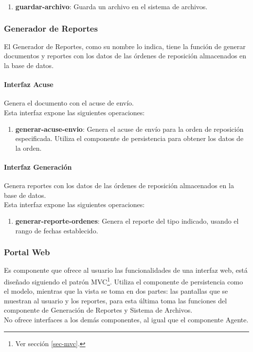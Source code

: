 \begin{enumerate}
	\item \textbf{guardar-archivo}: Guarda un archivo en el sistema de archivos.
\end{enumerate}

\subsubsection{Generador de Reportes}
El Generador de Reportes, como su nombre lo indica, tiene la función de generar documentos y reportes con los datos de las órdenes de reposición almacenados en la base de datos. 
\paragraph{Interfaz Acuse\\} Genera el documento con el acuse de envío.\\
Esta interfaz expone las siguientes operaciones:

\begin{enumerate}
	\item \textbf{generar-acuse-envio}: Genera el acuse de envío para la orden de reposición especificada. Utiliza el componente de persistencia para obtener los datos de la orden.
\end{enumerate}

\paragraph{Interfaz Generación\\} Genera reportes con los datos de las órdenes de reposición almacenados en la base de datos.\\
Esta interfaz expone las siguientes operaciones:

\begin{enumerate}
	\item \textbf{generar-reporte-ordenes}: Genera el reporte del tipo indicado, usando el rango de fechas establecido.
\end{enumerate}

\subsubsection{Portal Web}
Es componente que ofrece al usuario las funcionalidades de una interfaz web, está diseñado siguiendo el patrón MVC\footnote{Ver sección \ref{sec-mvc}.}. Utiliza el componente de persistencia como el modelo, mientras que la vista se toma en dos partes: las pantallas que se muestran al usuario y los reportes, para esta última toma las funciones del componente de Generación de Reportes y Sistema de Archivos.\\
No ofrece interfaces a los demás componentes, al igual que el componente Agente.



